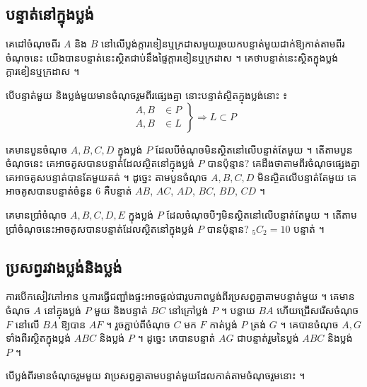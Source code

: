 \subsection{បន្ទាត់នៅក្នុងប្លង់}
គេដៅចំណុចពីរ $A$ និង $B$ នៅលើប្លង់ក្ដារខៀនឬក្រដាសមួយរួចយកបន្ទាត់មួយដាក់ឱ្យកាត់តាមពីរចំណុចនេះ យើងបានបន្ទាត់នេះស្ថិតជាប់នឹងផ្ទៃក្ដារខៀនឬក្រដាស ។ គេថាបន្ទាត់នេះស្ថិតក្នុងប្លង់ក្ដារខៀនឬក្រដាស ។
\begin{theorem}[លក្ខណៈ]
បើបន្ទាត់មួយ និងប្លង់មួយមានចំណុចរួមពីរផ្សេងគ្នា នោះបន្ទាត់ស្ថិតក្នុងប្លង់នោះ ៖
\[
\left.\begin{aligned} A, B &\in P\\ A, B &\in L \end{aligned}\right\} \Rightarrow L \subset P
\]
\end{theorem}

\begin{example}[លំហាត់គំរូ]
គេមានបួនចំណុច $A, B, C, D$ ក្នុងប្លង់ $P$ ដែលបីចំណុចមិនស្ថិតនៅលើបន្ទាត់តែមួយ ។ តើតាមបួនចំណុចនេះ គេអាចគូសបានបន្ទាត់ដែលស្ថិតនៅក្នុងប្លង់ $P$ បានប៉ុន្មាន?
\ans
គេដឹងថាតាមពីរចំណុចផ្សេងគ្នា គេអាចគូសបន្ទាត់បានតែមួយគត់ ។ ដូច្នេះ តាមបួនចំណុច $A, B, C, D$ មិនស្ថិតលើបន្ទាត់តែមួយ គេអាចគូសបានបន្ទាត់ចំនួន $6$ គឺបន្ទាត់ $AB$, $AC$, $AD$, $BC$, $BD$, $CD$ ។
\end{example}

\begin{pro}
គេមានប្រាំចំណុច $A, B, C, D, E$ ក្នុងប្លង់ $P$ ដែលចំណុចបីៗមិនស្ថិតនៅលើបន្ទាត់តែមួយ ។ តើតាមប្រាំចំណុចនេះអាចគូសបានបន្ទាត់ដែលស្ថិតនៅក្នុងប្លង់ $P$ បានប៉ុន្មាន?
\ans
${}_5C_2 = 10$ បន្ទាត់ ។
\end{pro}

\subsection{ប្រសព្វរវាងប្លង់និងប្លង់}
ការបើកសៀវភៅអាន ឬការធ្វើជញ្ជាំងផ្ទះអាចផ្ដល់ជារូបភាពប្លង់ពីរប្រសព្វគ្នាតាមបន្ទាត់មួយ ។ គេមានចំណុច $A$ នៅក្នុងប្លង់ $P$ មួយ និងបន្ទាត់ $BC$ នៅក្រៅប្លង់ $P$ ។ បន្លាយ $BA$ ហើយជ្រើសរើសចំណុច $F$ នៅលើ $BA$ ឱ្យបាន $AF$ ។ រួចភ្ជាប់ពីចំណុច $C$ មក $F$ កាត់ប្លង់ $P$ ត្រង់ $G$ ។ គេបានចំណុច $A, G$ ទាំងពីរស្ថិតក្នុងប្លង់ $ABC$ និងប្លង់ $P$ ។ ដូច្នេះ គេបានបន្ទាត់ $AG$ ជាបន្ទាត់រួមនៃប្លង់ $ABC$ និងប្លង់ $P$ ។
\begin{theorem}[សន្និដ្ឋាន]
បើប្លង់ពីរមានចំណុចរួមមួយ វាប្រសព្វគ្នាតាមបន្ទាត់មួយដែលកាត់តាមចំណុចរួមនោះ ។
\end{theorem}

